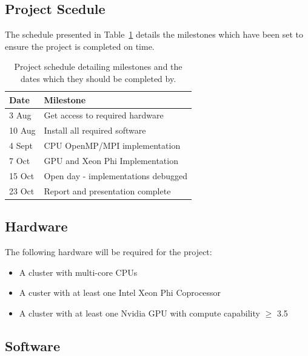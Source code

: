 \documentclass[10pt,twocolumn]{article}
\begin{document}
\subsection{Project Scedule}
The schedule presented in Table~\ref{tab:sched} details the milestones which have been set to ensure the 
project is completed on time.
\begin{table}[b!]
    \small
    \centering
    \caption{Project schedule detailing milestones and the dates which they should be completed by.}
    \label{tab:sched}
    \vspace{0.2cm}
    \begin{tabular}{l l}
        \hline  
        Date    & Milestone                                                         \\
        \hline
        \hline
        3 Aug   & Get access to required hardware                                   \\
        10 Aug  & Install all required software                                     \\
        4 Sept  & CPU OpenMP/MPI implementation                                     \\
        7 Oct   & GPU and Xeon Phi Implementation                                   \\
        15 Oct  & Open day - implementations debugged                               \\
        23 Oct  & Report and presentation complete                                  \\\hline
    \end{tabular}
\end{table}
\subsection{Hardware} \label{ssec:hware}

The following hardware will be required for the project:
\begin{itemize}[noitemsep]
    \item{A cluster with multi-core CPUs}
    \item{A custer with at least one Intel Xeon Phi Coprocessor}
    \item{A cluster with at least one Nvidia GPU with compute capability $\ge$ 3.5}
\end{itemize}

\subsection{Software} \label{ssec:sware}
\end{document}
